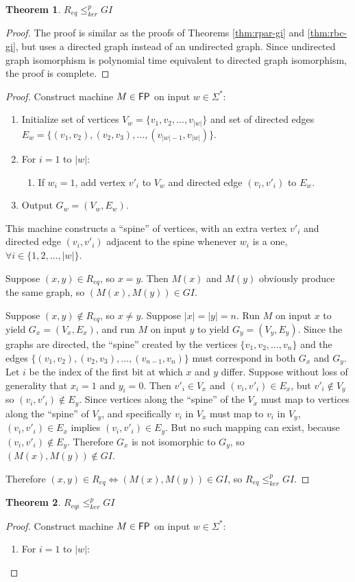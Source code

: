 \documentclass{article}
\newtheorem{theorem}{Theorem}[section]
\theoremstyle{definition}
\newcommand{\sigmastar}{\Sigma^{*}}
\newcommand{\kr}{\leq^{p}_{ker}} %
\begin{document}
\begin{theorem}$R_{eq} \kr GI$\end{theorem}
\begin{proof}The proof is similar as the proofs of Theorems \ref{thm:rpar-gi}
  and \ref{thm:rbc-gi}, but uses a directed graph instead of an undirected
  graph. Since undirected graph isomorphism is polynomial time equivalent to
  directed graph isomorphism, the proof is complete.\end{proof}
\begin{proof}
  Construct machine $M\in{\ensuremath{\mathsf{FP}}}$ on input $w\in\sigmastar$:
  \begin{enumerate}
  \item Initialize set of vertices $V_w=\{v_1, v_2, \ldots, v_{|w|}\}$
    and set of directed edges $E_w=\{(v_1, v_2),(v_2,
    v_3),\ldots,(v_{|w|-1}, v_{|w|})\}$.
  \item For $i=1$ to $|w|$:
    \begin{enumerate}
    \item If $w_i=1$, add vertex $v'_i$ to $V_w$ and directed edge $(v_i,
      v'_i)$ to $E_w$.
    \end{enumerate}
  \item Output $G_w=(V_w, E_w)$.
  \end{enumerate}
  This machine constructs a ``spine'' of vertices, with an extra vertex $v'_i$
  and directed edge $(v_i, v'_i)$ adjacent to the spine whenever $w_i$ is a
  one, $\forall i\in\{1,2,\ldots,|w|\}$.

  Suppose $(x, y)\in R_{eq}$, so $x=y$. Then $M(x)$ and $M(y)$ obviously
  produce the same graph, so $(M(x), M(y))\in GI$.
  

  Suppose $(x, y)\notin R_{eq}$, so $x\neq y$. Suppose $|x|=|y|=n$. Run $M$ on
  input $x$ to yield $G_x=(V_x, E_x)$, and run $M$ on input $y$ to yield
  $G_y=(V_y, E_y)$. Since the graphs are directed, the ``spine'' created by the
  vertices $\{v_1, v_2, \ldots, v_n\}$ and the edges $\{(v_1, v_2), (v_2, v_3),
  \ldots, (v_{n-1}, v_n)\}$ must correspond in both $G_x$ and $G_y$. Let $i$ be
  the index of the first bit at which $x$ and $y$ differ. Suppose without loss
  of generality that $x_i=1$ and $y_i=0$. Then $v'_i\in V_x$ and $(v_i,
  v'_i)\in E_x$, but $v'_i\notin V_y$ so $(v_i, v'_i)\notin E_y$. Since
  vertices along the ``spine'' of the $V_x$ must map to vertices along the
  ``spine'' of $V_y$, and specifically $v_i$ in $V_x$ must map to $v_i$ in
  $V_y$, $(v_i, v'_i)\in E_x$ implies $(v_i, v'_i)\in E_y$. But no such mapping
  can exist, because $(v_i, v'_i)\notin E_y$. Therefore $G_x$ is not isomorphic
  to $G_y$, so $(M(x), M(y))\notin GI$.

  Therefore $(x, y)\in R_{eq} \iff (M(x), M(y))\in GI$, so $R_{eq}\kr GI$.  
\end{proof}

\begin{theorem}$R_{eqi}\kr GI$\end{theorem}
\begin{proof}
  Construct machine $M\in {\ensuremath{\mathsf{FP}}}$ on input $w\in\sigmastar$:
  \begin{enumerate}
  \item For $i=1$ to $|w|$:
  \end{enumerate}
\end{proof}
\end{document}
